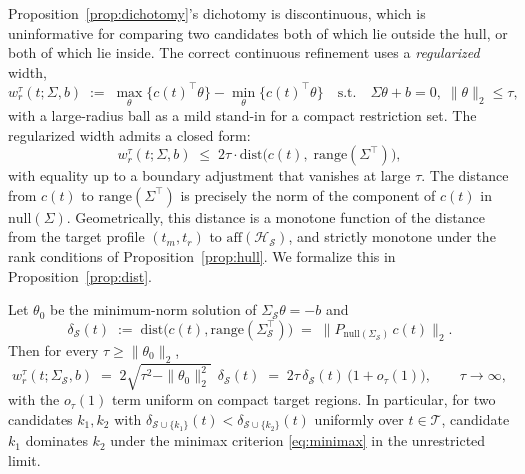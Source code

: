 Proposition~\ref{prop:dichotomy}'s dichotomy is discontinuous, which is
uninformative for comparing two candidates both of which lie outside the hull, or
both of which lie inside. The correct continuous refinement uses a
\emph{regularized} width,
\begin{equation}
\label{eq:regwidth}
w_r^\tau(t; \Sigma, b) \;:=\; \max_\theta\{c(t)^\top\theta\} -
 \min_\theta\{c(t)^\top\theta\}\quad
\text{s.t.}\quad
\Sigma\theta+b = 0,\; \|\theta\|_2 \le \tau,
\end{equation}
with a large-radius ball as a mild stand-in for a compact restriction set. The
regularized width admits a closed form:
\begin{equation}
\label{eq:distbound}
w_r^\tau(t; \Sigma, b) \;\le\; 2\tau \cdot \mathrm{dist}\!\bigl(
 c(t),\; \mathrm{range}(\Sigma^\top)\bigr),
\end{equation}
with equality up to a boundary adjustment that vanishes at large $\tau$. The
distance from $c(t)$ to $\mathrm{range}(\Sigma^\top)$ is precisely the norm of the
component of $c(t)$ in $\mathrm{null}(\Sigma)$. Geometrically, this distance is a
monotone function of the distance from the target profile $(t_m, t_r)$ to
$\mathrm{aff}(\mathcal{H}_\mathcal{S})$, and strictly monotone under the rank
conditions of Proposition~\ref{prop:hull}. We formalize this in
Proposition~\ref{prop:dist}.

\begin{proposition}[Regularized width $=2\tau\times$ range-distance]
\label{prop:dist}
Let $\theta_0$ be the minimum-norm solution of $\Sigma_\mathcal{S}\theta=-b$ and
\[
\delta_\mathcal{S}(t)\;:=\;\mathrm{dist}\bigl(c(t),\mathrm{range}(\Sigma_\mathcal{S}^\top)\bigr)
 \;=\;\bigl\|P_{\mathrm{null}(\Sigma_\mathcal{S})}\,c(t)\bigr\|_2 .
\]
Then for every $\tau\ge\|\theta_0\|_2$,
\begin{equation}
\label{eq:prop3}
w_r^\tau(t;\Sigma_\mathcal{S},b)
 \;=\; 2\sqrt{\tau^2-\|\theta_0\|_2^2}\;\,\delta_\mathcal{S}(t)
 \;=\; 2\tau\,\delta_\mathcal{S}(t)\,\bigl(1+o_\tau(1)\bigr),
\qquad \tau\to\infty,
\end{equation}
with the $o_\tau(1)$ term uniform on compact target regions. In particular, for
two candidates $k_1,k_2$ with
$\delta_{\mathcal{S}\cup\{k_1\}}(t)<\delta_{\mathcal{S}\cup\{k_2\}}(t)$
uniformly over $t\in\mathcal{T}$, candidate $k_1$ dominates $k_2$ under the
minimax criterion \eqref{eq:minimax} in the unrestricted limit.
\end{proposition}

